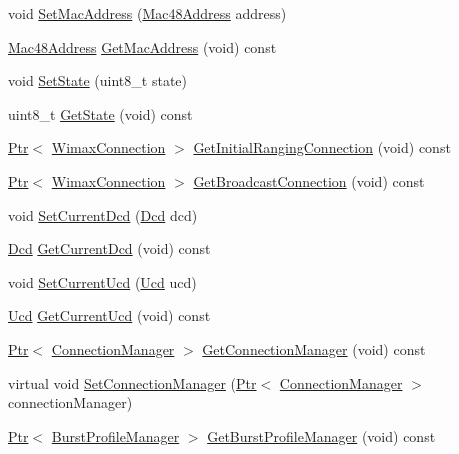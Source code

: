 \begin{DoxyCompactItemize}
\item 
void \hyperlink{classns3_1_1WimaxNetDevice_a5a61246bde2a85b90977564d9aabad70}{Set\+Mac\+Address} (\hyperlink{classns3_1_1Mac48Address}{Mac48\+Address} address)
\item 
\hyperlink{classns3_1_1Mac48Address}{Mac48\+Address} \hyperlink{classns3_1_1WimaxNetDevice_aa02eb7f6de9c03f0b8f2e33e3c5b5559}{Get\+Mac\+Address} (void) const 
\item 
void \hyperlink{classns3_1_1WimaxNetDevice_a6f3df9f6d5c94c02e7ecab21bfab2fce}{Set\+State} (uint8\+\_\+t state)
\item 
uint8\+\_\+t \hyperlink{classns3_1_1WimaxNetDevice_a4b7a2a630af23ac97b1012d5e5facc9f}{Get\+State} (void) const 
\item 
\hyperlink{classns3_1_1Ptr}{Ptr}$<$ \hyperlink{classns3_1_1WimaxConnection}{Wimax\+Connection} $>$ \hyperlink{classns3_1_1WimaxNetDevice_a2d1cf9aa6bcb809f54f58432f049853f}{Get\+Initial\+Ranging\+Connection} (void) const 
\item 
\hyperlink{classns3_1_1Ptr}{Ptr}$<$ \hyperlink{classns3_1_1WimaxConnection}{Wimax\+Connection} $>$ \hyperlink{classns3_1_1WimaxNetDevice_a11d2c7bbd695e2c845a821ec15baa2aa}{Get\+Broadcast\+Connection} (void) const 
\item 
void \hyperlink{classns3_1_1WimaxNetDevice_ab117daf48e12811b746173822f3869dd}{Set\+Current\+Dcd} (\hyperlink{classns3_1_1Dcd}{Dcd} dcd)
\item 
\hyperlink{classns3_1_1Dcd}{Dcd} \hyperlink{classns3_1_1WimaxNetDevice_ae8dcb382dcc6c34beb0d101d87b05598}{Get\+Current\+Dcd} (void) const 
\item 
void \hyperlink{classns3_1_1WimaxNetDevice_a554e03eca334044a2e3c404ded0916e5}{Set\+Current\+Ucd} (\hyperlink{classns3_1_1Ucd}{Ucd} ucd)
\item 
\hyperlink{classns3_1_1Ucd}{Ucd} \hyperlink{classns3_1_1WimaxNetDevice_adbd7f3476ff5df6f9babaf4f5de689ae}{Get\+Current\+Ucd} (void) const 
\item 
\hyperlink{classns3_1_1Ptr}{Ptr}$<$ \hyperlink{classns3_1_1ConnectionManager}{Connection\+Manager} $>$ \hyperlink{classns3_1_1WimaxNetDevice_a25450b18f62f91e4c2ab08485bd171a2}{Get\+Connection\+Manager} (void) const 
\item 
virtual void \hyperlink{classns3_1_1WimaxNetDevice_a10695f2de6789f2e66f54436eeb5f97b}{Set\+Connection\+Manager} (\hyperlink{classns3_1_1Ptr}{Ptr}$<$ \hyperlink{classns3_1_1ConnectionManager}{Connection\+Manager} $>$ connection\+Manager)
\item 
\hyperlink{classns3_1_1Ptr}{Ptr}$<$ \hyperlink{classns3_1_1BurstProfileManager}{Burst\+Profile\+Manager} $>$ \hyperlink{classns3_1_1WimaxNetDevice_adc0798ce5d154658179fcecaf5bc602f}{Get\+Burst\+Profile\+Manager} (void) const 

\end{DoxyCompactItemize}
